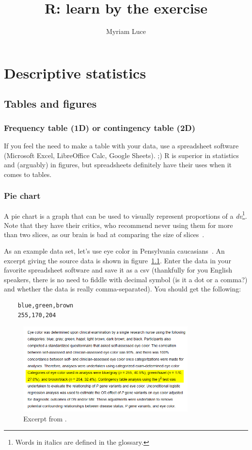 \documentclass{report}
\author{Myriam Luce}
\title{R: learn by the exercise}
\begin{document}
\maketitle
\tableofcontents

\chapter{Descriptive statistics}
	\section{Tables and figures}
	\subsection{Frequency table (1D) or contingency table (2D)}
If you feel the need to make a table with your data, use a spreadsheet software (Microsoft Excel, LibreOffice Calc, Google Sheets).  ;) R is superior in statistics and (arguably) in figures, but spreadsheets definitely have their uses when it comes to tables.
	\subsection{Pie chart}
A pie chart is a graph that can be used to visually represent proportions of a \emph{\gls{dv}}\footnote{Words in italics are defined in the glossary.}. Note that they have their critics, who recommend never using them for more than two slices, as our brain is bad at comparing the size of slices~\cite{wiki_pie}.

As an example data set, let's use eye color in Pensylvania caucasians~\cite{rebbeck_p_2002}. An excerpt giving the source data is shown in figure~\ref{fig:eyecolor}. Enter the data in your favorite spreadsheet software and save it as a csv (thankfully for you English speakers, there is no need to fiddle with decimal symbol (is it a dot or a comma?) and whether the data is really comma-separated). You should get the following:
\begin{verbatim}
	blue,green,brown
	255,170,204
\end{verbatim}
\begin{figure}[h]
	\centering
	\includegraphics[width=0.8\textwidth]{eyecolor.png}
	\caption{Excerpt from \cite{rebbeck_p_2002}.}
	\label{fig:eyecolor}
\end{figure}
\end{document}
